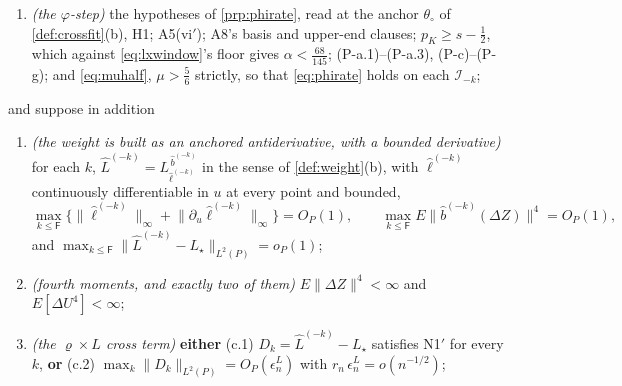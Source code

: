 \begin{theorem}
\begin{enumerate}
\item[(T-5)] \emph{(the $\varphi$-step)} the hypotheses of \cref{prp:phirate}, read at the anchor
$\theta_\circ$ of \cref{def:crossfit}(b), H1; A5(vi$'$); A8's basis and upper-end clauses;
$p_K\ge s-\tfrac12$, which against \eqref{eq:lxwindow}'s floor gives $\alpha<\tfrac{68}{145}$; (P-a.1)--(P-a.3), (P-c)--(P-g); and
\eqref{eq:muhalf}, $\mu>\tfrac56$ strictly, 
so that \eqref{eq:phirate} holds on each $\mathcal I_{-k}$;
\end{enumerate}
and suppose in addition
\begin{enumerate}
\item[(R-a)] \emph{(the weight is built as an anchored antiderivative, with a bounded derivative)} for each
$k$, $\hat L^{(-k)}=L^{\,\hat b^{(-k)}}_{\hat\ell^{(-k)}}$ in the sense of \cref{def:weight}(b), with
$\hat\ell^{(-k)}$ continuously differentiable in $u$ at every point and bounded,
\[
\max_{k\le\mathsf F}\Big\{\big\|\hat\ell^{(-k)}\big\|_\infty+\big\|\partial_u\hat\ell^{(-k)}\big\|_\infty\Big\}=O_P(1),
\qquad
\max_{k\le\mathsf F}E\big\|\hat b^{(-k)}(\Delta Z)\big\|^{4}=O_P(1),
\]
and $\max_{k\le\mathsf F}\|\hat L^{(-k)}-L_\star\|_{L^{2}(P)}=o_P(1)$;
\item[(R-b)] \emph{(fourth moments, and exactly two of them)} $E\|\Delta Z\|^{4}<\infty$ and
$E[\Delta U^{4}]<\infty$;
\item[(R-c)] \emph{(the $\varrho\times L$ cross term)} \textbf{either} \textup{(c.1)} $D_k=\hat L^{(-k)}-L_\star$
satisfies N1$'$ for every $k$, \textbf{or} \textup{(c.2)}
$\max_k\|D_k\|_{L^{2}(P)}=O_P(\epsilon^{L}_n)$ with $r_n\,\epsilon^{L}_n=o(n^{-1/2})$;

\end{enumerate}
\end{theorem}

